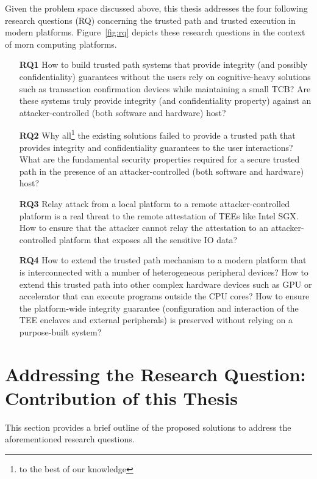 Given the problem space discussed above, this thesis addresses the four following research questions (RQ) concerning the trusted path and trusted execution in modern platforms. Figure~\ref{fig:rq} depicts these research questions in the context of morn computing platforms.
\begin{enumerate}
  
  	\item[\textbf{RQ1}] How to build trusted path systems that provide integrity (and possibly confidentiality) guarantees without the users rely on cognitive-heavy solutions such as transaction confirmation devices while maintaining a small TCB? Are these systems truly provide integrity (and confidentiality property) against an attacker-controlled (both software and hardware) host?
  	
    \item[\textbf{RQ2}] Why all\footnote{to the best of our knowledge} the existing solutions failed to provide a trusted path that provides integrity and confidentiality guarantees to the user interactions? What are the fundamental security properties required for a secure trusted path in the presence of an attacker-controlled (both software and hardware) host?
    
    \item[\textbf{RQ3}] Relay attack from a local platform to a remote attacker-controlled platform is a real threat to the remote attestation of TEEs like Intel SGX. How to ensure that the attacker cannot relay the attestation to an attacker-controlled platform that exposes all the sensitive IO data?
    
    \item[\textbf{RQ4}] How to extend the trusted path mechanism to a modern platform that is interconnected with a number of heterogeneous peripheral devices? How to extend this trusted path into other complex hardware devices such as GPU or accelerator that can execute programs outside the CPU cores? How to ensure the platform-wide integrity guarantee (configuration and interaction of the TEE enclaves and external peripherals) is preserved without relying on a purpose-built system?  
\end{enumerate}


\section{Addressing the Research Question: Contribution of this Thesis}


This section provides a brief outline of the proposed solutions to address the aforementioned research questions.

